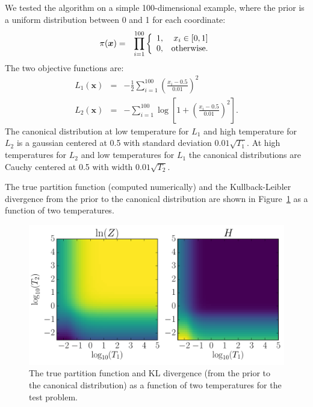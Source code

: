\documentclass[journal,article,accept,moreauthors,pdftex,12pt,a4paper]{mdpi}
\newcommand{\xx}{\boldsymbol{x}}
\begin{document}
We tested the algorithm on a simple 100-dimensional example, where the
prior is a uniform distribution between 0 and 1 for each coordinate:
\begin{eqnarray}
\pi(\xx) &=& \prod_{i=1}^{100}
\left\{
\begin{array}{lr}
1, & x_i \in [0, 1]\\
0, & \textnormal{otherwise.}
\end{array}
\right.
\end{eqnarray}
The two objective functions are:
\begin{eqnarray}
L_1(\xx) &=& -\frac{1}{2}\sum_{i=1}^{100} \left(\frac{x_i - 0.5}{0.01}\right)^2\\
L_2(\xx) &=& -\sum_{i=1}^{100} \log\left[1 +
\left(\frac{x_i - 0.5}{0.01}\right)^2
\right].
\end{eqnarray}
The canonical distribution at low temperature for $L_1$ and high temperature
for $L_2$ is a gaussian centered at 0.5 with standard deviation
$0.01\sqrt{T_1}$. At high temperatures for $L_2$ and low temperatures for $L_1$ the
canonical distributions are Cauchy centered at 0.5 with width
$0.01\sqrt{T_2}$.

The true partition function (computed numerically) and the Kullback-Leibler
divergence from the prior to the canonical distribution are shown in
Figure~\ref{fig:truth} as a function of two temperatures.

\begin{figure}
\centering
\includegraphics[scale=0.75]{figures/truth.pdf}
\caption{The true partition function and KL divergence (from the prior to
the canonical distribution) as a function of two temperatures for the
test problem.\label{fig:truth}}
\end{figure}
\end{document}
